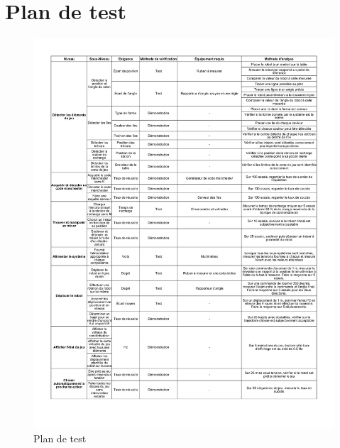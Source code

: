 \chapter{Plan de test}

\begin{figure}
  \centering
  \includegraphics[scale=0.75, angle=0]{resources/tests.pdf}
  \caption{Plan de test}
\end{figure}

